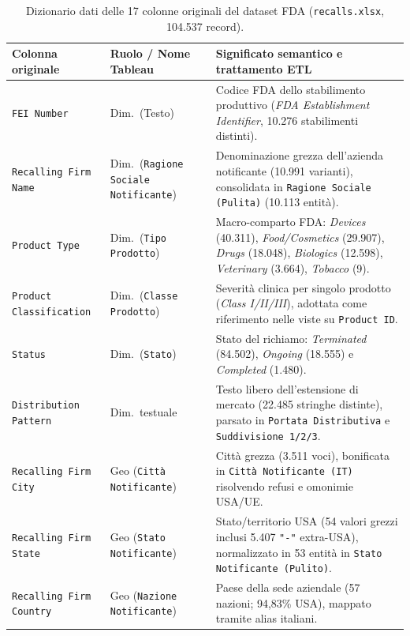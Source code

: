 \begin{table}[htbp]
\centering
\caption{Dizionario dati delle 17 colonne originali del dataset FDA (\texttt{recalls.xlsx}, 104.537 record).}
\label{tab:fda_data_dictionary}
\footnotesize
\setlength{\tabcolsep}{4pt}
\begin{tabularx}{\textwidth}{@{}>{\raggedright\arraybackslash}p{3.5cm}>{\raggedright\arraybackslash}p{2.9cm}>{\raggedright\arraybackslash}X@{}}
\toprule
\textbf{Colonna originale} & \textbf{Ruolo / Nome Tableau} & \textbf{Significato semantico e trattamento ETL} \\
\midrule
\texttt{FEI Number} & Dim.\ (Testo) & Codice FDA dello stabilimento produttivo (\textit{FDA Establishment Identifier}, 10.276 stabilimenti distinti). \\
\texttt{Recalling Firm Name} & Dim.\ (\texttt{Ragione Sociale Notificante}) & Denominazione grezza dell'azienda notificante (10.991 varianti), consolidata in \texttt{Ragione Sociale (Pulita)} (10.113 entità). \\
\texttt{Product Type} & Dim.\ (\texttt{Tipo Prodotto}) & Macro-comparto FDA: \textit{Devices} (40.311), \textit{Food/Cosmetics} (29.907), \textit{Drugs} (18.048), \textit{Biologics} (12.598), \textit{Veterinary} (3.664), \textit{Tobacco} (9). \\
\texttt{Product Classification} & Dim.\ (\texttt{Classe Prodotto}) & Severità clinica per singolo prodotto (\textit{Class I/II/III}), adottata come riferimento nelle viste su \texttt{Product ID}. \\
\texttt{Status} & Dim.\ (\texttt{Stato}) & Stato del richiamo: \textit{Terminated} (84.502), \textit{Ongoing} (18.555) e \textit{Completed} (1.480). \\
\texttt{Distribution Pattern} & Dim.\ testuale & Testo libero dell'estensione di mercato (22.485 stringhe distinte), parsato in \texttt{Portata Distributiva} e \texttt{Suddivisione 1/2/3}. \\
\texttt{Recalling Firm City} & Geo (\texttt{Città Notificante}) & Città grezza (3.511 voci), bonificata in \texttt{Città Notificante (IT)} risolvendo refusi e omonimie USA/UE. \\
\texttt{Recalling Firm State} & Geo (\texttt{Stato Notificante}) & Stato/territorio USA (54 valori grezzi inclusi 5.407 \texttt{"-"} extra-USA), normalizzato in 53 entità in \texttt{Stato Notificante (Pulito)}. \\
\texttt{Recalling Firm Country} & Geo (\texttt{Nazione Notificante}) & Paese della sede aziendale (57 nazioni; 94,83\% USA), mappato tramite alias italiani. \\

\end{tabularx}
\end{table}
